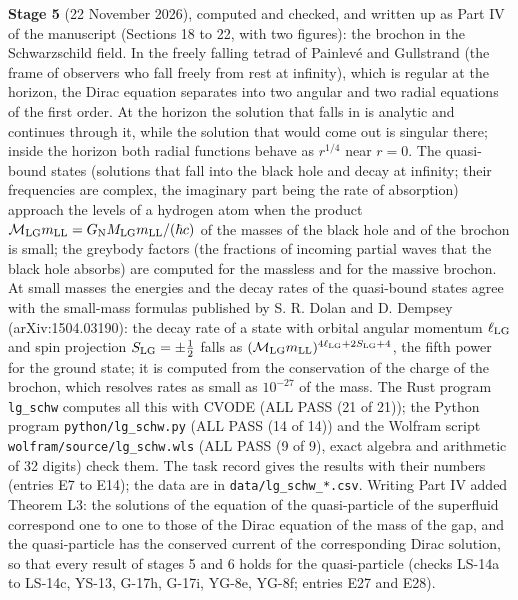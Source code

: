 \documentclass[
  10pt,
]{article}
\begin{document}
\textbf{Stage 5} (22 November 2026), computed and checked, and written
up as Part IV of the manuscript (Sections 18 to 22, with two figures):
the brochon in the Schwarzschild field. In the freely falling tetrad of
Painlevé and Gullstrand (the frame of observers who fall freely from
rest at infinity), which is regular at the horizon, the Dirac equation
separates into two angular and two radial equations of the first order.
At the horizon the solution that falls in is analytic and continues
through it, while the solution that would come out is singular there;
inside the horizon both radial functions behave as \(r^{1/4}\) near
\(r=0\). The quasi-bound states (solutions that fall into the black hole
and decay at infinity; their frequencies are complex, the imaginary part
being the rate of absorption) approach the levels of a hydrogen atom
when the product
\(\mathcal M_{\rm LG}m_{\rm LL}=G_{\rm N}M_{\rm LG}m_{\rm LL}/(\hbar c)\)
of the masses of the black hole and of the brochon is small; the
greybody factors (the fractions of incoming partial waves that the black
hole absorbs) are computed for the massless and for the massive brochon.
At small masses the energies and the decay rates of the quasi-bound
states agree with the small-mass formulas published by S. R. Dolan and
D. Dempsey (arXiv:1504.03190): the decay rate of a state with orbital
angular momentum \(\ell_{\rm LG}\) and spin projection
\(S_{\rm LG}=\pm\tfrac12\) falls as
\((\mathcal M_{\rm LG}m_{\rm LL})^{4\ell_{\rm LG}+2S_{\rm LG}+4}\), the
fifth power for the ground state; it is computed from the conservation
of the charge of the brochon, which resolves rates as small as
\(10^{-27}\) of the mass. The Rust program \texttt{lg\_schw} computes
all this with CVODE (ALL PASS (21 of 21)); the Python program
\texttt{python/lg\_schw.py} (ALL PASS (14 of 14)) and the Wolfram script
\texttt{wolfram/source/lg\_schw.wls} (ALL PASS (9 of 9), exact algebra
and arithmetic of 32 digits) check them. The task record gives the
results with their numbers (entries E7 to E14); the data are in
\texttt{data/lg\_schw\_*.csv}. Writing Part IV added Theorem L3: the
solutions of the equation of the quasi-particle of the superfluid
correspond one to one to those of the Dirac equation of the mass of the
gap, and the quasi-particle has the conserved current of the
corresponding Dirac solution, so that every result of stages 5 and 6
holds for the quasi-particle (checks LS-14a to LS-14c, YS-13, G-17h,
G-17i, YG-8e, YG-8f; entries E27 and E28).
\end{document}
